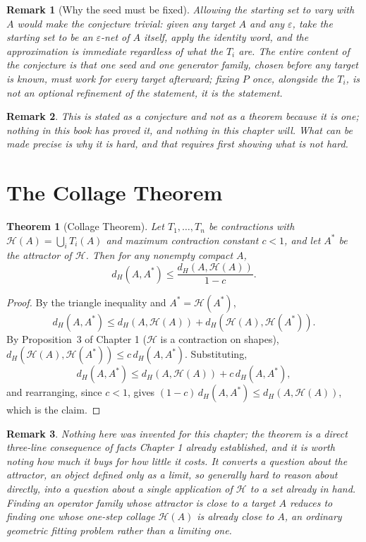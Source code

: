 \documentclass[11pt]{report}
\newtheorem{theorem}{Theorem}[chapter]
\newtheorem{remark}{Remark}[chapter]
\begin{document}
\begin{remark}[Why the seed must be fixed]
Allowing the starting set to vary with $A$ would make the conjecture
trivial: given any target $A$ and any $\varepsilon$, take the starting
set to be an $\varepsilon$-net of $A$ itself, apply the identity word,
and the approximation is immediate regardless of what the $T_i$ are.
The entire content of the conjecture is that one seed and one
generator family, chosen before any target is known, must work for
every target afterward; fixing $P$ once, alongside the $T_i$, is not
an optional refinement of the statement, it is the statement.
\end{remark}

\begin{remark}
This is stated as a conjecture and not as a theorem because it is
one; nothing in this book has proved it, and nothing in this chapter
will. What can be made precise is why it is hard, and that requires
first showing what is \emph{not} hard.
\end{remark}

\section*{The Collage Theorem}

\begin{theorem}[Collage Theorem]
\label{thm:collage}
Let $T_1, \dots, T_n$ be contractions with $\mathcal{H}(A) =
\bigcup_i T_i(A)$ and maximum contraction constant $c < 1$, and let
$A^\ast$ be the attractor of $\mathcal{H}$. Then for any nonempty
compact $A$,
\[
d_H(A, A^\ast) \leq \frac{d_H(A, \mathcal{H}(A))}{1-c}.
\]
\end{theorem}
\begin{proof}
By the triangle inequality and $A^\ast = \mathcal{H}(A^\ast)$,
\[
d_H(A, A^\ast) \leq d_H(A, \mathcal{H}(A)) + d_H(\mathcal{H}(A), \mathcal{H}(A^\ast)).
\]
By Proposition~3 of Chapter 1 ($\mathcal{H}$ is a contraction on
shapes), $d_H(\mathcal{H}(A), \mathcal{H}(A^\ast)) \leq c\, d_H(A,
A^\ast)$. Substituting,
\[
d_H(A, A^\ast) \leq d_H(A, \mathcal{H}(A)) + c\, d_H(A, A^\ast),
\]
and rearranging, since $c < 1$, gives
$(1-c)\, d_H(A,A^\ast) \leq d_H(A, \mathcal{H}(A))$, which is the
claim.
\end{proof}

\begin{remark}
Nothing here was invented for this chapter; the theorem is a direct
three-line consequence of facts Chapter 1 already established, and it
is worth noting how much it buys for how little it costs. It converts
a question about the attractor, an object defined only as a limit, so
generally hard to reason about directly, into a question about a
single application of $\mathcal{H}$ to a set already in hand. Finding
an operator family whose attractor is close to a target $A$ reduces to
finding one whose \emph{one-step collage} $\mathcal{H}(A)$ is already
close to $A$, an ordinary geometric fitting problem rather than a
limiting one.
\end{remark}
\end{document}
